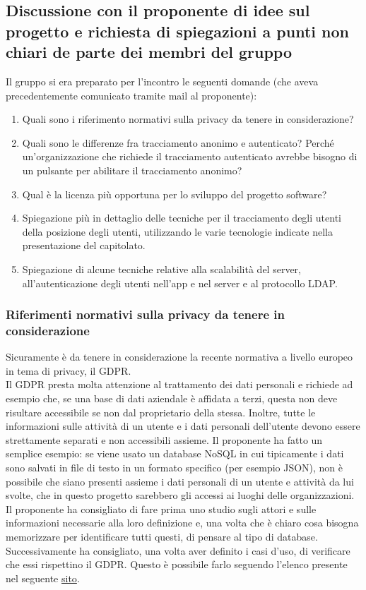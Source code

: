 \subsection{Discussione con il proponente di idee sul progetto \NomeProgetto e richiesta di spiegazioni a punti non chiari de parte dei membri del gruppo}
Il gruppo si era preparato per l'incontro le seguenti domande (che aveva precedentemente comunicato tramite mail al proponente):
\begin{enumerate}
	\item Quali sono i riferimento normativi sulla privacy da tenere in considerazione?
	\item Quali sono le differenze fra tracciamento anonimo e autenticato? Perché un'organizzazione che richiede il tracciamento autenticato avrebbe bisogno di un pulsante per abilitare il tracciamento anonimo?
	\item Qual è la licenza più opportuna per lo sviluppo del progetto software?
	\item Spiegazione più in dettaglio delle tecniche per il tracciamento degli utenti della posizione degli utenti, utilizzando le varie tecnologie indicate nella presentazione del capitolato.
	\item Spiegazione di alcune tecniche relative alla scalabilità del server, all'autenticazione degli utenti nell'app e nel server e al protocollo LDAP.
\end{enumerate}
\subsubsection*{Riferimenti normativi sulla privacy da tenere in considerazione}
Sicuramente è da tenere in considerazione la recente normativa a livello europeo in tema di privacy, il GDPR. \\
Il GDPR presta molta attenzione al trattamento dei dati personali e richiede ad esempio che, se una base di dati aziendale è affidata a terzi, questa non deve risultare accessibile se non dal proprietario della stessa.
Inoltre, tutte le informazioni sulle attività di un utente e i dati personali dell'utente devono essere strettamente separati e non accessibili assieme. Il proponente ha fatto un semplice esempio: se viene usato un database
NoSQL in cui tipicamente i dati sono salvati in file di testo in un formato specifico (per esempio JSON), non è possibile che siano presenti assieme i dati personali di un utente e attività da lui svolte, che in questo progetto
sarebbero gli accessi ai luoghi delle organizzazioni.
Il proponente ha consigliato di fare prima uno studio sugli attori e sulle informazioni necessarie alla loro definizione e, una volta che è chiaro cosa bisogna memorizzare per identificare tutti questi, di pensare al tipo di database.
Successivamente ha consigliato, una volta aver definito i casi d'uso, di verificare che essi rispettino il GDPR. Questo è possibile farlo seguendo l'elenco presente nel seguente \href{https://gdpr.eu/checklist/}{sito}.

